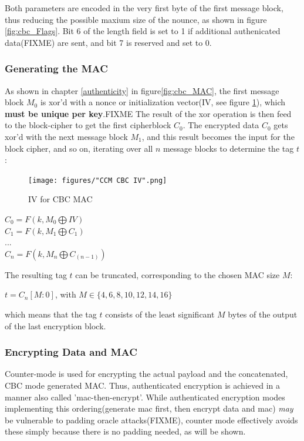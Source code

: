 Both parameters are encoded in the very first byte of the first message block, thus reducing the possible maxium size of the nounce, as shown in figure \ref{fig:cbc_Flags}.
Bit 6 of the length field is set to 1 if additional authenicated data(FIXME) are sent, and bit 7 is reserved and set to 0.


\subsubsection{Generating the MAC}

As shown in chapter \ref{authenticity} in figure\ref{fig:cbc_MAC}, the first message block $M_0$ is \gls{xor}'d with a nonce or initialization vector(IV, see figure
\ref{fig:ccrMacIV}), which \textbf{must be unique per key}.FIXME
The result of the \gls{xor} operation is then feed to the block-cipher to get the first cipherblock $C_0$. The encrypted data $C_0$ gets \gls{xor}'d with the next message block $M_1$, and this
result becomes the input for the block cipher, and so on, iterating over all $n$ message blocks to determine the tag $t$:

\begin{figure}
    \centering
    \texttt{[image: figures/"CCM CBC IV".png]}
    \caption{IV for CBC MAC}
    \label{fig:ccrMacIV}
\end{figure}


\begin{center}
 $C_0 = F(k, M_0 \bigoplus IV )$
 \\
 $C_1 = F(k, M_1 \bigoplus C_1) $
 \\
 $...$
 \\
 $C_n = F(k, M_n \bigoplus C_{(n-1)})$
 \\
\end{center}

The resulting tag $t$ can be truncated, corresponding to the chosen MAC size $M$:
\begin{center}
  $t = C_n[M:0]$, with $M \in \{4, 6, 8, 10, 12, 14, 16\}$
\end{center}
which means that the tag $t$ consists of the least significant $M$ bytes of the output of the last encryption block.

\subsubsection{Encrypting Data and MAC}

Counter-mode is used for encrypting the actual payload and the concatenated, CBC mode generated MAC.
Thus, authenticated encryption is achieved in a manner also called 'mac-then-encrypt'. While authenticated
encryption modes implementing this ordering(generate mac first, then encrypt data and mac) \textit{may}
be vulnerable to padding oracle attacks(FIXME), counter mode effectively avoids these simply because
there is no padding needed, as will be shown.

